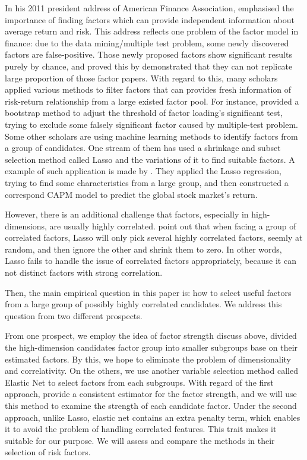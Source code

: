 In his 2011 president address of American Finance Association, \citeauthor{Cochrane2011} emphasised the importance of finding factors which can provide independent information about average return and risk.
This address reflects one problem of the factor model in finance: due to the data mining/multiple test problem, some newly discovered factors are false-positive.
Those newly proposed factors show significant results purely by chance, and  proved this by demonstrated that they can not replicate large proportion of those factor papers.
With regard to this, many scholars applied various methods to filter factors that can provides fresh information of risk-return relationship from a large existed factor pool.
For instance,  provided a bootstrap method to adjust the threshold of factor loading's significant test, trying to exclude some falsely significant factor caused by multiple-test problem.
Some other scholars are using machine learning methods to identify factors from a group of candidates.
One stream of them has used a shrinkage and subset selection method called Lasso \cite{Tibshirani1996} and the variations of it to find suitable factors.
A example of such application is made by .
They applied the Lasso regression, trying to find some characteristics from a large group, and then constructed a correspond CAPM model to predict the global stock market's return.

However, there is an additional challenge that factors, especially in high-dimensions, are usually highly correlated.
 point out that when facing a group of correlated factors, Lasso will only pick several highly correlated factors, seemly at random, and then ignore the other and shrink them to zero. 
In other words, Lasso fails to handle the issue of correlated factors appropriately, because it can not distinct factors with strong correlation.

Then, the main empirical question in this paper is: how to select useful factors from a large group of possibly highly correlated candidates.
We address this question from two different prospects.


From one prospect, we employ the idea of factor strength discuss above, divided the high-dimension candidates factor group into smaller subgroups base on their estimated factors.
By this, we hope to eliminate the problem of dimensionality and correlativity.
On the others, we use another variable selection method called Elastic Net \cite{Zou2005} to select factors from each subgroups.
With regard of the first approach,  provide a consistent estimator for the factor strength, and we will use this method to examine the strength of each candidate factor.
Under the second approach, unlike Lasso, elastic net contains an extra penalty term, which enables it to avoid the problem of handling correlated features.
This trait makes it suitable for our purpose.
We will assess and compare the methods in their selection of risk factors.



